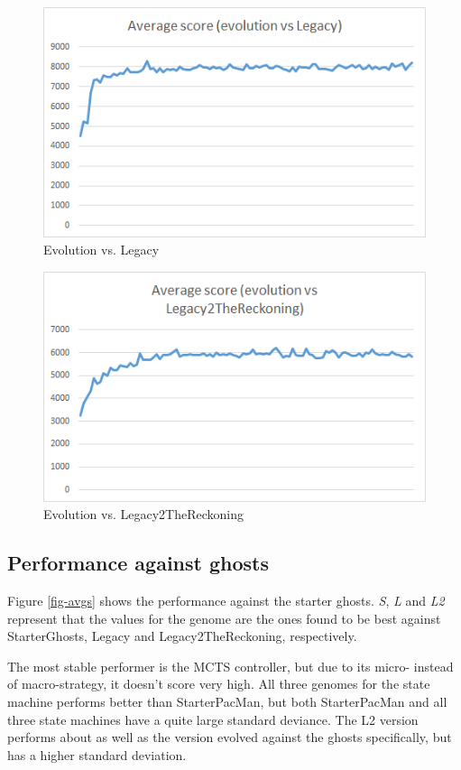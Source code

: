 \documentclass[conference]{IEEEtran}
\begin{document}
\begin{figure}[htp]
\centerline{\includegraphics[width=0.9\columnwidth]{l_evo.png}}
\caption{Evolution vs. Legacy}
\label{fig-evol}
\end{figure}

\begin{figure}[htp]
\centerline{\includegraphics[width=0.9\columnwidth]{l2_evo.png}}
\caption{Evolution vs. Legacy2TheReckoning}
\label{fig-evol2}
\end{figure}

\subsection{Performance against ghosts}

Figure \ref{fig-avgs} shows the performance against the starter ghosts. \emph{S}, \emph{L} and \emph{L2} represent that the values for the genome are the ones found to be best against StarterGhosts, Legacy and Legacy2TheReckoning, respectively.

The most stable performer is the MCTS controller, but due to its micro- instead of macro-strategy, it doesn't score very high. All three genomes for the state machine performs better than StarterPacMan, but both StarterPacMan and all three state machines have a quite large standard deviance. The L2 version performs about as well as the version evolved against the ghosts specifically, but has a higher standard deviation.
\end{document}

